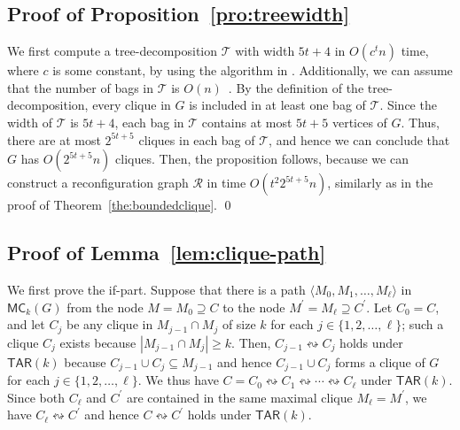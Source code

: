\documentclass{llncs}
\newcommand{\sevstep}{\leftrightsquigarrow}
\newcommand{\MC}[2]{\mathsf{MC}_{#1}(#2)}
\newcommand{\TAR}[1]{\mathsf{TAR}(#1)}
\newcommand{\cliq}{C}
\newcommand{\cgraph}{\mathcal{R}}
\newcounter{one}
\begin{document}
	\subsection{Proof of Proposition~\ref{pro:treewidth}}
We first compute a tree-decomposition $\mathcal{T}$ with width $5t + 4$ in $O(c^{t} n)$ time, where $c$ is some constant,
	by using the algorithm in \cite{BodlaenderDDFLP13}.
	Additionally, we can assume that the number of bags in $\mathcal{T}$ is $O(n)$~\cite{BodlaenderDDFLP13}.
	By the definition of the tree-decomposition, every clique in $G$ is included in at least one bag of $\mathcal{T}$.
	Since the width of $\mathcal{T}$ is $5t + 4$, each bag in $\mathcal{T}$ contains at most $5t+5$ vertices of $G$.
	Thus, there are at most $2^{5t+5}$ cliques in each bag of $\mathcal{T}$, and hence we can conclude that $G$ has $O(2^{5t+5} n)$ cliques.
	Then, the proposition follows, because we can construct a reconfiguration graph $\cgraph$ in time $O(t^2 2^{5t+5} n)$, similarly as in the proof of Theorem~\ref{the:boundedclique}.
	\qed




	\subsection{Proof of Lemma~\ref{lem:clique-path}}
We first prove the if-part.
	Suppose that there is a path $\langle M_{0}, M_{1}, \dots, M_{\ell} \rangle$ in $\MC{k}{G}$ from the node $M = M_{0} \supseteq \cliq$ to the node $M^\prime = M_{\ell} \supseteq \cliq^\prime$.
	Let $\cliq_0 = \cliq$, and let $\cliq_j$ be any clique in $M_{j-1} \cap M_{j}$ of size $k$ for each $j \in \{1, 2, \ldots, \ell\}$; 
such a clique $\cliq_j$ exists because $|M_{j-1} \cap M_j| \ge k$. 
	Then, $\cliq_{j-1} \sevstep \cliq_j$ holds under $\TAR{k}$ because $\cliq_{j-1} \cup \cliq_j \subseteq M_{j-1}$ and hence $\cliq_{j-1} \cup \cliq_j$ forms a clique of $G$ for each $j \in \{1, 2, \ldots, \ell\}$.
	We thus have $\cliq = \cliq_0 \sevstep \cliq_1 \sevstep \cdots \sevstep \cliq_\ell$ under $\TAR{k}$. 
	Since both $\cliq_{\ell}$ and $\cliq^\prime$ are contained in the same maximal clique $M_{\ell} = M^\prime$, we have $\cliq_{\ell} \sevstep \cliq^\prime$ and hence $\cliq \sevstep \cliq^\prime$ holds under $\TAR{k}$.
 
\end{document}
